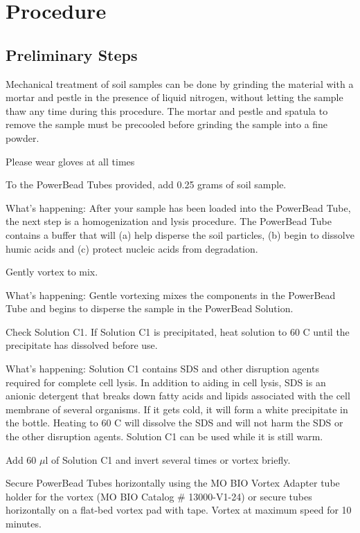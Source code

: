 \documentclass[12pt]{../SOP3_alpha}
\begin{document}
\section{Procedure}

\subsection*{Preliminary Steps} 
 
\NP Mechanical treatment of soil samples can be done by grinding the material with a mortar and pestle in the presence of liquid nitrogen, without letting the sample thaw any time during this procedure. The mortar and pestle and spatula to remove the sample must be precooled before grinding the sample into a fine powder.

Please wear gloves at all times

\NP To the PowerBead Tubes provided, add 0.25 grams of soil sample.

What's happening: After your sample has been loaded into the PowerBead Tube, the next step is a homogenization and lysis procedure. The PowerBead
Tube contains a buffer that will (a) help disperse the soil particles, (b) begin to dissolve humic acids and (c) protect nucleic acids from degradation.

\NP Gently vortex to mix.

What's happening: Gentle vortexing mixes the components in the PowerBead Tube and begins to disperse the sample in the PowerBead Solution.

\NP Check Solution C1. If Solution C1 is precipitated, heat solution to 60 \degree C until the precipitate has dissolved before use.

What's happening: Solution C1 contains SDS and other disruption agents required for complete cell lysis. In addition to aiding in cell lysis, SDS is an anionic detergent that breaks down fatty acids and lipids associated with the cell membrane of several organisms. If it gets cold, it will form a white precipitate in the bottle. Heating to 60 \degree C will dissolve the SDS and will not harm the SDS or the other disruption agents. Solution C1 can be used while it is still warm.

\NP Add 60 $\mu$l of Solution C1 and invert several times or vortex briefly.

\NP Secure PowerBead Tubes horizontally using the MO BIO Vortex Adapter tube holder for the vortex (MO BIO Catalog \# 13000-V1-24) or secure tubes
horizontally on a flat-bed vortex pad with tape. Vortex at maximum speed for 10 minutes.
\end{document}
